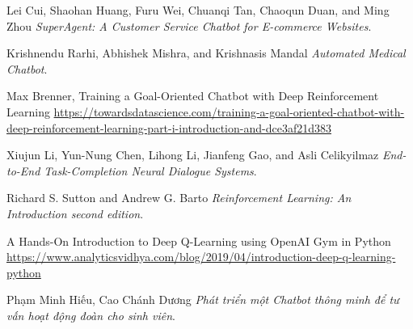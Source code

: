 \begin{thebibliography}{99}
\raggedright
Lei Cui, Shaohan Huang, Furu Wei, Chuanqi Tan, Chaoqun Duan, and Ming Zhou
\textit{SuperAgent: A Customer Service Chatbot for E-commerce Websites}.

Krishnendu Rarhi, Abhishek Mishra, and Krishnasis Mandal
\textit{Automated Medical Chatbot}.

Max Brenner, Training a Goal-Oriented Chatbot with Deep Reinforcement
Learning
\url{https://towardsdatascience.com/training-a-goal-oriented-chatbot-with-deep-reinforcement-learning-part-i-introduction-and-dce3af21d383}

Xiujun Li, Yun-Nung Chen, Lihong Li, Jianfeng Gao, and Asli Celikyilmaz
\textit{End-to-End Task-Completion Neural Dialogue Systems}.

Richard S. Sutton and Andrew G. Barto
\textit{Reinforcement Learning: An Introduction second edition}.

A Hands-On Introduction to Deep Q-Learning using OpenAI Gym in Python
\url{https://www.analyticsvidhya.com/blog/2019/04/introduction-deep-q-learning-python}

Phạm Minh Hiếu, Cao Chánh Dương
\textit{Phát triển một Chatbot thông minh để tư vấn hoạt động đoàn
cho sinh viên}.

\end{thebibliography}
